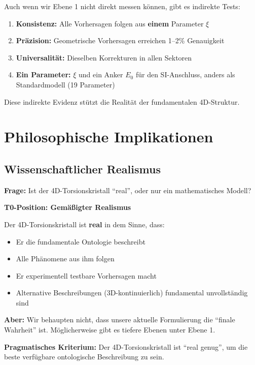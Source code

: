 	Auch wenn wir Ebene 1 nicht direkt messen können, gibt es indirekte Tests:
	
	\begin{enumerate}
		\item \textbf{Konsistenz:} Alle Vorhersagen folgen aus \textbf{einem} Parameter $\xi$
		\item \textbf{Präzision:} Geometrische Vorhersagen erreichen 1--2\% Genauigkeit
		\item \textbf{Universalität:} Dieselben Korrekturen in allen Sektoren
		\item \textbf{Ein Parameter:} $\xi$ und ein Anker $E_0$ für den SI-Anschluss, anders als Standardmodell (19 Parameter)
	\end{enumerate}
	
	Diese indirekte Evidenz stützt die Realität der fundamentalen 4D-Struktur.
	
	\section{Philosophische Implikationen}
	
	\subsection{Wissenschaftlicher Realismus}
	
	\begin{philosophical}
		\textbf{Frage:} Ist der 4D-Torsionskristall \enquote{real}, oder nur ein mathematisches Modell?
		
		\vspace{0.3cm}
		
		\textbf{T0-Position: Gemäßigter Realismus}
		
		Der 4D-Torsionskristall ist \textbf{real} in dem Sinne, dass:
		\begin{itemize}
			\item Er die fundamentale Ontologie beschreibt
			\item Alle Phänomene aus ihm folgen
			\item Er experimentell testbare Vorhersagen macht
			\item Alternative Beschreibungen (3D-kontinuierlich) fundamental unvollständig sind
		\end{itemize}
		
		\vspace{0.3cm}
		
		\textbf{Aber:}
		Wir behaupten nicht, dass unsere aktuelle Formulierung die \enquote{finale Wahrheit} ist. Möglicherweise gibt es tiefere Ebenen unter Ebene 1.
		
		\vspace{0.3cm}
		
		\textbf{Pragmatisches Kriterium:}
		Der 4D-Torsionskristall ist \enquote{real genug}, um die beste verfügbare ontologische Beschreibung zu sein.
	\end{philosophical}
	
